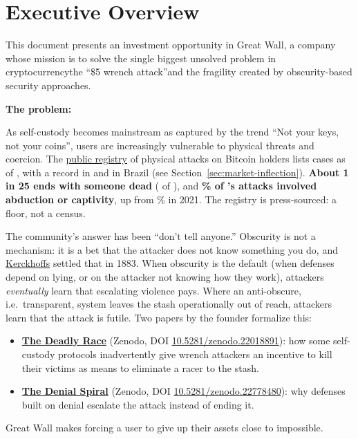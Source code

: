 
\section*{Executive Overview}
This document presents an investment opportunity in Great Wall, a company whose mission is to solve the single biggest unsolved problem in cryptocurrency\textemdash the ``\$5 wrench attack''\textemdash and the fragility created by obscurity-based security approaches.

\textbf{The problem:} \par
As self-custody becomes mainstream as captured by the trend ``Not your keys, not your coins'', users are increasingly vulnerable to physical threats and coercion. The \href{\registryurl}{public registry} of physical attacks on Bitcoin holders\cite{lopp2024} lists \textbf{\attacksTotal} cases as of \attacksAsOf, with a record \attacksRecordYearCount{} in \attacksRecordYear{} and \attacksBrazil{} in Brazil (see Section~\ref{sec:market-inflection}). \textbf{About 1 in 25 ends with someone dead} (\attacksKilled{} of \attacksTotal), and \textbf{\attacksAbductNow\% of \attacksRecordYear's attacks involved abduction or captivity}, up from \attacksAbductThen\% in 2021. The registry is press-sourced: a floor, not a census.

The community's answer has been ``don't tell anyone.'' Obscurity is not a mechanism: it is a bet that the attacker does not know something you do, and \href{\kprincipleurl}{Kerckhoffs} settled that in 1883. When obscurity is the default (when defenses depend on lying, or on the attacker not knowing how they work), attackers \emph{eventually} learn that escalating violence pays. Where an anti-obscure, i.e.\ transparent, system leaves the stash operationally out of reach, attackers learn that the attack is futile. Two papers by the founder formalize this:
\begin{itemize}
    \item \textbf{\href{\drurl}{The Deadly Race}} (Zenodo, DOI \href{\drurl}{10.5281/zenodo.22018891}): how some self-custody protocols inadvertently give wrench attackers an incentive to kill their victims as means to eliminate a racer to the stash.
    \item \textbf{\href{\dsurl}{The Denial Spiral}} (Zenodo, DOI \href{\dsurl}{10.5281/zenodo.22778480}): why defenses built on denial escalate the attack instead of ending it.
\end{itemize}
Great Wall makes forcing a user to give up their assets close to impossible.

